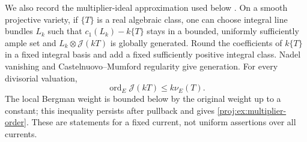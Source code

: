 \documentclass[11pt,letterpaper]{article}
\theoremstyle{definition}
\theoremstyle{remark}
\begin{document}
We also record the multiplier-ideal approximation used below
\cite[Theorems~5.11, 6.27, and 14.2]{Proj-Demailly2012}. On a smooth projective variety, if \(\{T\}\)
is a real algebraic class, one can choose integral line bundles
\(L_k\) such that \(c_1(L_k)-k\{T\}\) stays in a bounded,
uniformly sufficiently ample set and
\(L_k\otimes\mathcal J(kT)\) is globally generated. Round the
coefficients of \(k\{T\}\) in a fixed integral basis and add a
fixed sufficiently positive integral class. Nadel vanishing and
Castelnuovo--Mumford regularity give generation. For every
divisorial valuation,
\begin{equation}\label{proj:ex:multiplier-order}
 \operatorname{ord}_E\mathcal J(kT)\leq k\nu_E(T).
\end{equation}
The local Bergman weight is bounded below by the original weight
up to a constant; this inequality persists after pullback and
gives \eqref{proj:ex:multiplier-order}. These are statements for a
fixed current, not uniform assertions over all currents.
\end{document}
